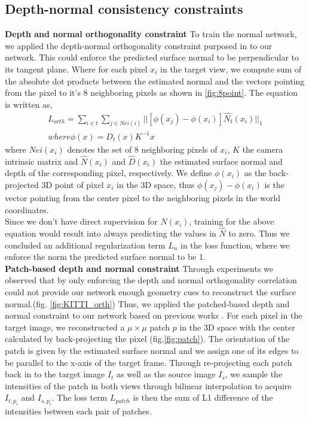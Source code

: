 \documentclass[10pt,twocolumn,letterpaper]{article}
\begin{document}
\subsection{Depth-normal consistency constraints}
\textbf{Depth and normal orthogonality constraint} To train the normal network, we applied the depth-normal orthogonality constraint purposed in \cite{yang2017unsupervised} to our network. This could enforce the predicted surface normal to be perpendicular to its tangent plane. Where for each pixel $x_i$ in the target view, we compute sum of the absolute dot products between the estimated normal and the vectors pointing from the pixel to it's 8 neighboring pixels as shown in \ref{fig:8point}. The equation is written as,
\begin{multline}
    L_{orth} = \sum_{i\in t}\sum_{j\in Nei(i)}||[ \phi(x_j) - \phi(x_i)] \hat{N_t}(x_i)||_1 
    \\
where \phi(x) = D_t(x)K^{-1}x
\end{multline}
where $Nei(x_i)$ denotes the set of 8 neighboring pixels of $x_i$, $K$ the camera intrinsic matrix and $\hat N(x_i)$ and $\hat D(x_i)$ the estimated surface normal and depth of the corresponding pixel, respectively. We define $\phi(x_i)$ as the back-projected 3D point of pixel $x_i$ in the 3D space, thus $\phi(x_j) - \phi(x_i)$ is the vector pointing from the center pixel to the neighboring pixels in the world coordinates. \\
Since we don't have direct supervision for $N(x_i)$, training for the above equation would result into always predicting the values in $\hat{N}$ to zero. Thus we concluded an additional regularization term $L_n$ in the loss function, where we enforce the norm the predicted surface normal to be 1.
\\
\textbf{Patch-based depth and normal constraint} Through experiments we observed that by only enforcing the depth and normal orthogonality correlation could not provide our network enough geometry cues to reconstruct the surface normal.(fig. \ref{fig:KITTI_orth}) Thus, we applied the patched-based depth and normal constraint to our network based on previous works \cite{furukawa2010accurate}. For each pixel in the target image, we reconstructed a $\mu \times \mu$ patch $p$ in the 3D space with the center calculated by back-projecting the pixel (fig.\ref{fig:patch}). The orientation of the patch is given by the estimated surface normal and we assign one of its edges to be parallel to the x-axis of the target frame. Through re-projecting each patch back in to the target image $I_t$ as well as the source image $I_s$, we sample the intensities of the patch in both views through bilinear interpolation to acquire $I_{t,p_i}$ and $I_{s,p_i}$. The loss term $L_{patch}$ is then the sum of L1 difference of the intensities between each pair of patches. 
\end{document}
